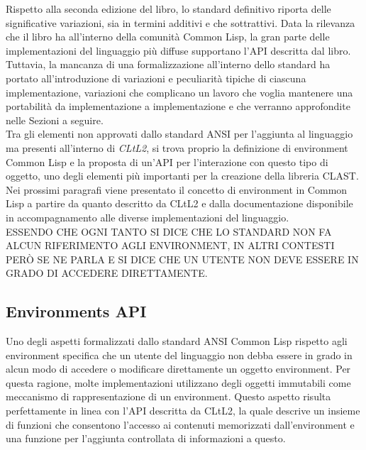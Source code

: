 Rispetto alla seconda edizione del libro, lo standard definitivo riporta delle
significative variazioni, sia in termini additivi e che sottrattivi. Data la
rilevanza che il libro ha all’interno della comunità Common Lisp, la gran
parte delle implementazioni del linguaggio più diffuse supportano l’API
descritta dal libro. Tuttavia, la mancanza di una formalizzazione all’interno
dello standard ha portato all’introduzione di variazioni e peculiarità tipiche
di ciascuna implementazione, variazioni che complicano un lavoro che voglia
mantenere una portabilità da implementazione a implementazione e che verranno
approfondite nelle Sezioni a seguire.\\

Tra gli elementi non approvati dallo standard ANSI per l’aggiunta al
linguaggio ma presenti all’interno di \textit{CLtL2}, si trova proprio la
definizione di environment Common Lisp e la proposta di un'API per
l’interazione con questo tipo di oggetto, uno degli elementi più importanti
per la creazione della libreria CLAST. Nei prossimi paragrafi viene presentato
il concetto di environment in Common Lisp a partire da quanto descritto da
CLtL2 e dalla documentazione disponibile in accompagnamento alle diverse
implementazioni del linguaggio.\\

ESSENDO CHE OGNI TANTO SI DICE CHE LO STANDARD NON FA ALCUN RIFERIMENTO AGLI
ENVIRONMENT, IN ALTRI CONTESTI PERÒ SE NE PARLA E SI DICE CHE UN UTENTE NON
DEVE ESSERE IN GRADO DI ACCEDERE DIRETTAMENTE.

\subsection{Environments API}

Uno degli aspetti formalizzati dallo standard ANSI Common Lisp rispetto agli
environment specifica che un utente del linguaggio non debba essere in grado
in alcun modo di accedere o modificare direttamente un oggetto environment.
Per questa ragione, molte implementazioni utilizzano degli oggetti immutabili
come meccanismo di rappresentazione di un environment. Questo aspetto risulta
perfettamente in linea con l’API descritta da CLtL2, la quale descrive un
insieme di funzioni che consentono l’accesso ai contenuti memorizzati
dall’environment e una funzione per l’aggiunta controllata di informazioni a
questo.

